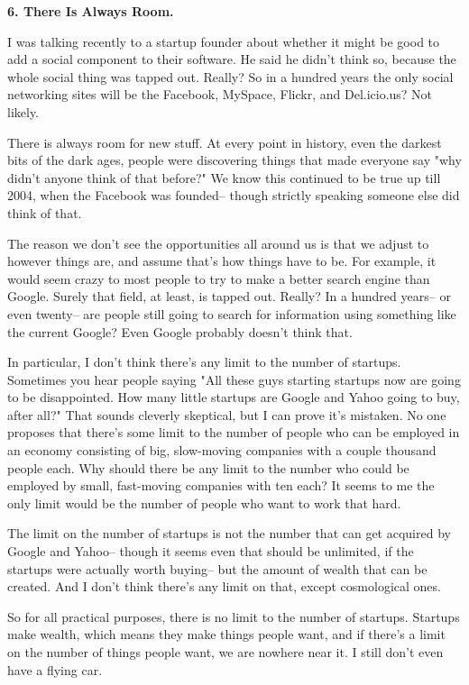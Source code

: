 \textbf{6. There Is Always Room.}

I was talking recently to a startup founder about whether it might
be good to add a social component to their software.  He said he
didn't think so, because the whole social thing was tapped out.
Really?  So in a hundred years the only social networking sites
will be the Facebook, MySpace, Flickr, and Del.icio.us?  Not likely.

There is always room for new stuff.  At every point in history,
even the darkest bits of the dark ages, people were discovering
things that made everyone say "why didn't anyone think of that
before?"  We know this continued to be true up till 2004, when the
Facebook was founded-- though strictly speaking someone else did
think of that.

The reason we don't see the opportunities all around us is that we
adjust to however things are, and assume that's how things have to
be.  For example, it would seem crazy to most people to try to make
a better search engine than Google.  Surely that field, at least,
is tapped out.  Really?  In a hundred years-- or even twenty-- are
people still going to search for information using something like
the current Google?  Even Google probably doesn't think that.

In particular, I don't think there's any limit to the number of
startups.  Sometimes you hear people saying "All these guys starting
startups now are going to be disappointed. How many little startups
are Google and Yahoo going to buy, after all?" That sounds cleverly
skeptical, but I can prove it's mistaken.  No one proposes that
there's some limit to the number of people who can be employed in
an economy consisting of big, slow-moving companies with a couple
thousand people each.  Why should there be any limit to the number
who could be employed by small, fast-moving companies with ten each?
It seems to me the only limit would be the number of people who
want to work that hard.

The limit on the number of startups is not the number that can get
acquired by Google and Yahoo-- though it seems even that should
be unlimited, if the startups were actually worth buying-- but the
amount of wealth that can be created.  And I don't think there's
any limit on that, except cosmological ones.

So for all practical purposes, there is no limit to the number of
startups.  Startups make wealth, which means they make things people
want, and if there's a limit on the number of things people want,
we are nowhere near it.  I still don't even have a flying car.


